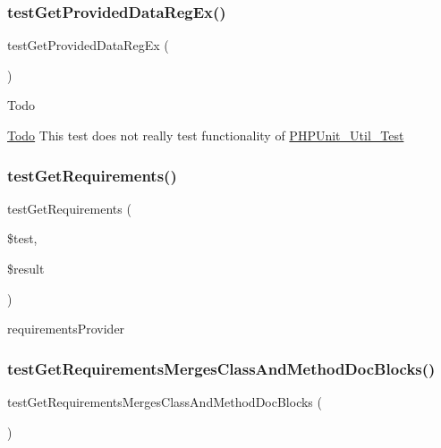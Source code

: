 \subsubsection{\texorpdfstring{test\+Get\+Provided\+Data\+Reg\+Ex()}{testGetProvidedDataRegEx()}}
{\footnotesize\ttfamily test\+Get\+Provided\+Data\+Reg\+Ex (\begin{DoxyParamCaption}{ }\end{DoxyParamCaption})}

\begin{DoxyRefDesc}{Todo}
\item[\mbox{\hyperlink{todo__todo000019}{Todo}}]This test does not really test functionality of \mbox{\hyperlink{class_p_h_p_unit___util___test}{P\+H\+P\+Unit\+\_\+\+Util\+\_\+\+Test}} \end{DoxyRefDesc}
\mbox{\label{class_util___test_test_a54ee59b4a21e55206f788755363f2cec}} 
\subsubsection{\texorpdfstring{test\+Get\+Requirements()}{testGetRequirements()}}
{\footnotesize\ttfamily test\+Get\+Requirements (\begin{DoxyParamCaption}\item[{}]{\$test,  }\item[{}]{\$result }\end{DoxyParamCaption})}

requirements\+Provider \mbox{\label{class_util___test_test_ad44a1754603a697e8d3bc60f7e19b3eb}} 
\subsubsection{\texorpdfstring{test\+Get\+Requirements\+Merges\+Class\+And\+Method\+Doc\+Blocks()}{testGetRequirementsMergesClassAndMethodDocBlocks()}}
{\footnotesize\ttfamily test\+Get\+Requirements\+Merges\+Class\+And\+Method\+Doc\+Blocks (\begin{DoxyParamCaption}{ }\end{DoxyParamCaption})}

